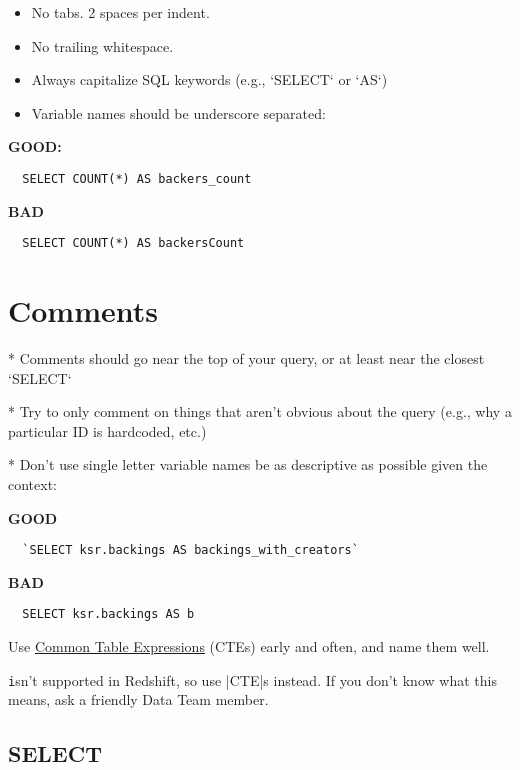 \begin{itemize}
\item No tabs. 2 spaces per indent.
\item No trailing whitespace.
\item Always capitalize SQL keywords (e.g., `SELECT` or `AS`)
\item Variable names should be underscore separated:
\end{itemize}



\textbf{GOOD:}

\begin{verbatim}
  SELECT COUNT(*) AS backers_count
\end{verbatim}

\textbf{BAD}
  
\begin{verbatim} 
  SELECT COUNT(*) AS backersCount
\end{verbatim}  

\section{Comments}

* Comments should go near the top of your query, or at least near the closest `SELECT`

* Try to only comment on things that aren't obvious about the query (e.g., why a particular ID is hardcoded, etc.)

* Don't use single letter variable names be as descriptive as possible given the context:

\textbf{GOOD}

\begin{verbatim}
  `SELECT ksr.backings AS backings_with_creators`
\end{verbatim}

\textbf{BAD}
\begin{verbatim}
  SELECT ksr.backings AS b
\end{verbatim}


Use \href{http://www.postgresql.org/docs/8.4/static/queries-with.html}{Common Table Expressions} (CTEs) early and often, and name them well.

\texttt isn't supported in Redshift, so use |CTE|s instead. If you don't know what this means, ask a friendly Data Team member.

\subsection{SELECT}

